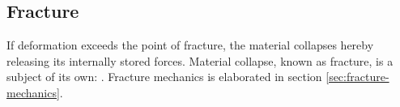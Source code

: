 \subsection{Fracture}
If deformation exceeds the point of fracture, the material
collapses hereby releasing its internally stored forces. Material
collapse, known as fracture, is a subject of its own:
. Fracture mechanics is elaborated in
section \vref{sec:fracture-mechanics}.






